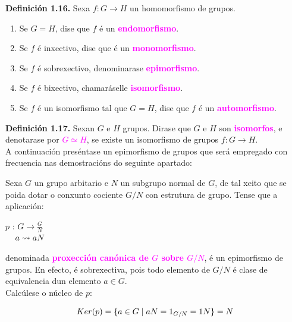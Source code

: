 \documentclass[twoside]{report}
\newcommand{\magbf}[1]{\textcolor{magenta}{\textbf{#1}}} %
\theoremstyle{mystyle}
\begin{document}
\noindent \textbf{Definición 1.16.} Sexa $f: G \longrightarrow H$ un homomorfismo de grupos.
\begin{enumerate}
    \item Se $G = H$, dise que $f$ é un \magbf{endomorfismo}.
    \item Se $f$ é inxectivo, dise que é un \magbf{monomorfismo}.
    \item Se $f$ é sobrexectivo, denominarase \magbf{epimorfismo}.
    \item Se $f$ é bixectivo, chamaráselle \magbf{isomorfismo}.
    \item Se $f$ é un isomorfismo tal que $G = H$, dise que $f$ é un \magbf{automorfismo}.
\end{enumerate}

\vspace{3mm}

\noindent \textbf{Definición 1.17.} Sexan $G$ e $H$ grupos. Dirase que $G$ e $H$ son \magbf{isomorfos}, e denotarase por \textcolor{magenta}{$G \simeq H$}, se existe un isomorfismo de grupos $f: G \longrightarrow H$.\\

\noindent A continuación preséntase un epimorfismo de grupos que será empregado con frecuencia nas demostracións do seguinte apartado: 

\begin{mdframed}[linecolor = magenta]

\noindent Sexa $G$ un grupo arbitario e $N$ un subgrupo normal de $G$, de tal xeito que se poida dotar o conxunto cociente $G/N$ con estrutura de grupo. Tense que a aplicación: 

    \begin{center}
        $p$ : $G  \longrightarrow \displaystyle \frac{G}{N} $\\
        \vspace{2mm}
        $\hspace{4mm} a \leadsto aN$
    \end{center} 
    
\noindent denominada \magbf{proxección canónica de $G$ sobre $G/N$}, é un epimorfismo de grupos. En efecto, é sobrexectiva, pois todo elemento de $G/N$ é clase de equivalencia dun elemento $a \in G$.\\

\noindent Calcúlese o núcleo de $p$:

$$Ker(p) = \{ a \in G \hspace{1mm} | \hspace{1mm} aN = 1_{G/N} = 1N\} = N$$

\end{mdframed}
\end{document}
